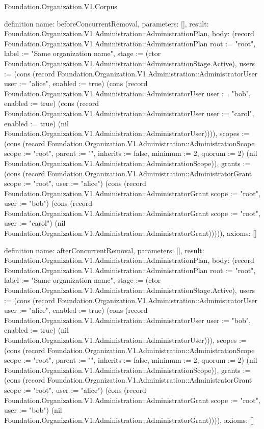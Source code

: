 \begin{lexlean}{Foundation.Organization.V1.Corpus}
\begin{semanticmodule}
definition{
  name: beforeConcurrentRemoval,
  parameters: [],
  result: Foundation.Organization.V1.Administration::AdministrationPlan,
  body: (record Foundation.Organization.V1.Administration::AdministrationPlan {root := "root", label := "Same organization name", stage := (ctor Foundation.Organization.V1.Administration::AdministrationStage.Active), users := (cons (record Foundation.Organization.V1.Administration::AdministratorUser {user := "alice", enabled := true}) (cons (record Foundation.Organization.V1.Administration::AdministratorUser {user := "bob", enabled := true}) (cons (record Foundation.Organization.V1.Administration::AdministratorUser {user := "carol", enabled := true}) (nil Foundation.Organization.V1.Administration::AdministratorUser)))), scopes := (cons (record Foundation.Organization.V1.Administration::AdministrationScope {scope := "root", parent := "", inherits := false, minimum := 2, quorum := 2}) (nil Foundation.Organization.V1.Administration::AdministrationScope)), grants := (cons (record Foundation.Organization.V1.Administration::AdministratorGrant {scope := "root", user := "alice"}) (cons (record Foundation.Organization.V1.Administration::AdministratorGrant {scope := "root", user := "bob"}) (cons (record Foundation.Organization.V1.Administration::AdministratorGrant {scope := "root", user := "carol"}) (nil Foundation.Organization.V1.Administration::AdministratorGrant))))}),
  axioms: []
}

definition{
  name: afterConcurrentRemoval,
  parameters: [],
  result: Foundation.Organization.V1.Administration::AdministrationPlan,
  body: (record Foundation.Organization.V1.Administration::AdministrationPlan {root := "root", label := "Same organization name", stage := (ctor Foundation.Organization.V1.Administration::AdministrationStage.Active), users := (cons (record Foundation.Organization.V1.Administration::AdministratorUser {user := "alice", enabled := true}) (cons (record Foundation.Organization.V1.Administration::AdministratorUser {user := "bob", enabled := true}) (nil Foundation.Organization.V1.Administration::AdministratorUser))), scopes := (cons (record Foundation.Organization.V1.Administration::AdministrationScope {scope := "root", parent := "", inherits := false, minimum := 2, quorum := 2}) (nil Foundation.Organization.V1.Administration::AdministrationScope)), grants := (cons (record Foundation.Organization.V1.Administration::AdministratorGrant {scope := "root", user := "alice"}) (cons (record Foundation.Organization.V1.Administration::AdministratorGrant {scope := "root", user := "bob"}) (nil Foundation.Organization.V1.Administration::AdministratorGrant)))}),
  axioms: []
}


\end{semanticmodule}
\end{lexlean}
